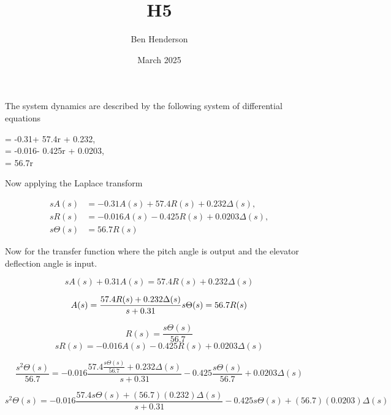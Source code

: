 \documentclass{article}
\title{H5}
\author{Ben Henderson}
\date{March 2025}
\begin{document}
\maketitle

\vspace{5mm}

\section{}

The system dynamics are described by the following system of differential equations

\begin{center}
\dot{\alpha} = -0.31\alpha + 57.4r + 0.232\delta, \\
 = -0.016\alpha - 0.425r + 0.0203\delta,  \\
\dot{\theta} = 56.7r \\
\end{center}

Now applying the Laplace transform

\begin{center}
\begin{align*}
sA(s) &= -0.31A(s) + 57.4R(s) + 0.232\Delta(s), \\
sR(s) &= -0.016A(s) - 0.425R(s) + 0.0203\Delta(s), \\
s\Theta(s) &= 56.7R(s)
\end{align*}
\end{center}


\vspace{20mm}

Now for the transfer function where the pitch angle is output and the elevator deflection angle is input.

\vspace{5mm}

\[
sA(s) + 0.31A(s) =  57.4R(s) + 0.232\Delta(s)
\]

\[
A(s) = \frac{57.4R(s) + 0.232\Delta(s)}{s + 0.31} \\
s\Theta(s) = 56.7R(s)
\]

\[
R(s) = \frac{s\Theta(s)}{56.7}
\]
\[
sR(s) = -0.016A(s) - 0.425R(s) + 0.0203\Delta(s)
\]

\[
\frac{s^2\Theta(s)}{56.7} = -0.016\frac{57.4\frac{s\Theta(s)}{56.7} + 0.232\Delta(s)}{s + 0.31} - 0.425\frac{s\Theta(s)}{56.7}+0.0203\Delta(s)
\]


\[
s^2\Theta(s) = -0.016\frac{57.4s\Theta(s) + (56.7)(0.232)\Delta(s)}{s + 0.31} - 0.425s\Theta(s)+(56.7)(0.0203)\Delta(s)
\]
\end{document}
